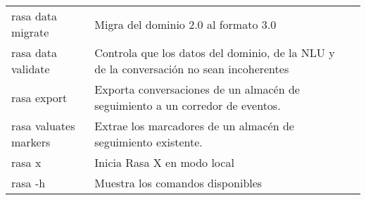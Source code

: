 \begin{appendices}
\begin{table}[h]
{\begin{tabular}{|l|l|l}
\multirow{2}{*}{rasa data migrate}     & \multirow{2}{*}{Migra del dominio 2.0 al formato 3.0}                                                                                   &  \\
                                       &                                                                                                                                         &  \\ \cline{1-2}
\multirow{2}{*}{rasa data validate}    & \multirow{2}{*}{Controla que los datos del  dominio, de la NLU y de la conversación no sean incoherentes}                               &  \\
                                       &                                                                                                                                         &  \\ \cline{1-2}
\multirow{2}{*}{rasa export}           & \multirow{2}{*}{Exporta conversaciones de un almacén de seguimiento a un corredor de eventos.}                                          &  \\
                                       &                                                                                                                                         &  \\ \cline{1-2}
\multirow{2}{*}{rasa valuates markers} & \multirow{2}{*}{Extrae los marcadores de un almacén de seguimiento existente.}                                                          &  \\
                                       &                                                                                                                                         &  \\ \cline{1-2}
\multirow{2}{*}{rasa x}                & \multirow{2}{*}{Inicia Rasa X en modo local}                                                                                            &  \\
                                       &                                                                                                                                         &  \\ \cline{1-2}
\multirow{2}{*}{rasa -h}               & \multirow{2}{*}{Muestra los comandos disponibles}                                                                                       &  \\
                                       &                                                                                                                                         &  \\ \cline{1-2}
\end{tabular}%
}
\end{table}



\end{appendices}
